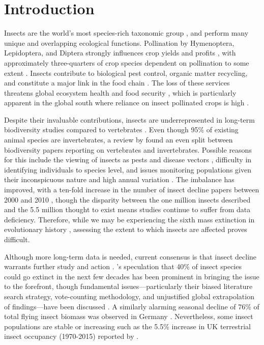 \documentclass[11pt]{article}
\begin{document}
	\clearpage 
	
	\section{Introduction}
		Insects are the world’s most species-rich taxonomic group \parencite{homburg2019have,cardoso2020scientists}, and perform many unique and overlapping ecological functions. Pollination by Hymenoptera, Lepidoptera, and Diptera strongly influences crop yields and profits \parencite{habel2019mitigating}, with approximately three-quarters of crop species dependent on pollination to some extent \parencite{klein2007importance}. Insects contribute to biological pest control, organic matter recycling, and constitute a major link in the food chain \parencite{sanchez2019worldwide}. The loss of these services threatens global ecosystem health and food security \parencite{potts2016safeguarding}, which is particularly apparent in the global south where reliance on insect pollinated crops is high \parencite{dicks2021global}. 
		
		\noindent Despite their invaluable contributions, insects are underrepresented in long-term biodiversity studies compared to vertebrates \parencite{outhwaite2020complex,wagner2021insect}. Even though 95\% of existing animal species are invertebrates, a review by \textcite{titley2017scientific} found an even split between biodiversity papers reporting on vertebrates and invertebrates. Possible reasons for this include the viewing of insects as pests and disease vectors \parencite{lawton1998biodiversity,milivcic2021insect}, difficulty in identifying individuals to species level, and issues monitoring populations given their inconspicuous nature and high annual variation \parencite{fox2019insect}. The imbalance has improved, with a ten-fold increase in the number of insect decline papers between 2000 and 2010 \parencite{eggleton2020state}, though the disparity between the one million insects described and the 5.5 million thought to exist \parencite{stork2018many} means studies continue to suffer from data deficiency. Therefore, while we may be experiencing the sixth mass extinction in evolutionary history \parencite{dirzo2014defaunation}, assessing the extent to which insects are affected proves difficult. 
		
		\noindent Although more long-term data is needed, current consensus is that insect decline warrants further study and action \parencite{montgomery2020insect}. \textcite{sanchez2019worldwide}'s speculation that 40\% of insect species could go extinct in the next few decades has been prominent in bringing the issue to the forefront, though fundamental issues—particularly their biased literature search strategy, vote-counting methodology, and unjustified global extrapolation of findings—have been discussed \parencite{simmons2019worldwide,saunders2020moving}. A similarly alarming seasonal decline of 76\% of total flying insect biomass was observed in Germany \parencite{hallmann2017more}. Nevertheless, some insect populations are stable or increasing \parencite{boyes2019bucking,wagner2021insect} such as the 5.5\% increase in UK terrestrial insect occupancy (1970-2015) reported by \textcite{outhwaite2020complex}. 
		
\end{document}
